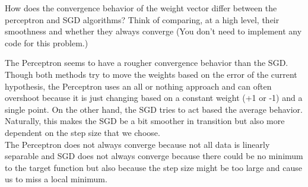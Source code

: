 \begin{problem}[2]
How does the convergence behavior of the weight vector differ between the perceptron and SGD algorithms? Think of comparing, at a high level, their smoothness and whether they always converge (You don't need to implement any code for this problem.)
\end{problem}
\begin{solution}
  The Perceptron seems to have a rougher convergence behavior than the SGD. Though both methods try to move the weights based on the error of the current hypothesis, the Perceptron uses an all or nothing approach and can often overshoot because it is just changing based on a constant weight (+1 or -1) and a single point. On the other hand, the SGD tries to act based the average behavior. Naturally, this makes the SGD be a bit smoother in transition but also more dependent on the step size that we choose. \\
  The Perceptron does not always converge because not all data is linearly separable and SGD does not always converge because there could be no minimum to the target function but also because the step size might be too large and cause us to miss a local minimum.
\end{solution}
